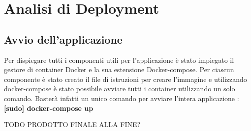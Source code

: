 

\chapter{Analisi di Deployment}
\section{Avvio dell'applicazione}
Per dispiegare tutti i componenti utili per l’applicazione è stato impiegato il
gestore di container Docker e la sua estensione Docker-compose.
Per ciascun componente è stato creato il file di istruzioni per creare l’immagine
e utilizzando docker-compose è stato possibile avviare tutti i container utilizzando un solo comando.
Basterà infatti un unico comando per avviare l'intera applicazione : \textbf{[sudo] docker-compose up}


TODO PRODOTTO FINALE ALLA FINE?